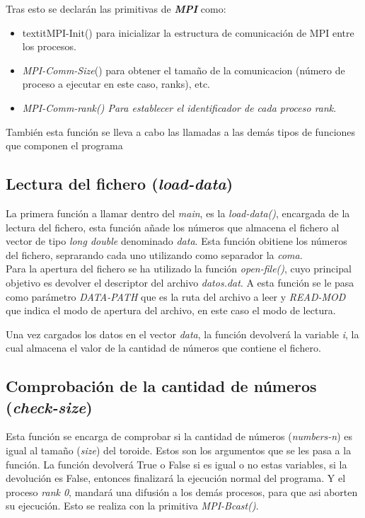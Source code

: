 \documentclass[11pt]{article}
\begin{document}
Tras esto se declarán las primitivas de \textit{\textbf{MPI}} como: 
\begin{itemize}
	\item textit{MPI-Init}() para inicializar la estructura de comunicación de MPI entre los procesos. 
	\item \textit{MPI-Comm-Size}() para obtener el tamaño de la comunicacion (número de proceso a ejecutar en este caso, ranks), etc.
	\item \textit{MPI-Comm-rank() Para establecer el identificador de cada proceso \textit{rank}}.
\end{itemize}

También esta función se lleva a cabo las llamadas a las demás tipos de funciones que componen el programa



\subsection{Lectura del fichero (\textit{load-data})}
La primera función a llamar dentro del \textit{main}, es la \textit{load-data()}, encargada de la lectura del fichero, esta función añade los números que almacena el fichero al vector de tipo \textit{long double} denominado \textit{data}.
Esta función obitiene los números del fichero, seprarando cada uno utilizando como separador la \textit{coma}.\\

Para la apertura del fichero se ha utilizado la función \textit{open-file()}, cuyo principal objetivo es devolver el descriptor del archivo \textit{datos.dat}.
A esta función se le pasa como parámetro \textit{DATA-PATH} que es la ruta del archivo a leer y \textit{READ-MOD} que indica el modo de apertura del archivo, en este caso el modo de lectura.


Una vez cargados los datos en el vector \textit{data}, la función devolverá la variable \textit{i}, la cual almacena el valor de la cantidad de números que contiene el fichero.


\subsection{Comprobación de la cantidad de números (\textit{check-size})}
Esta función se encarga de comprobar si la cantidad de números (\textit{numbers-n}) es igual al tamaño (\textit{size}) del toroide. Estos son los argumentos que se les pasa a la función.
La función devolverá True o False si es igual o no estas variables, si la devolución es False, entonces finalizará la ejecución normal del programa. Y el proceso \textit{rank 0}, mandará una difusión a los demás procesos, para que asi aborten su ejecución. Esto se realiza con la primitiva \textit{MPI-Bcast()}. 
\end{document}
